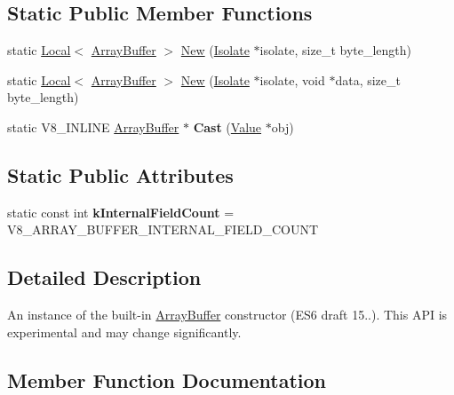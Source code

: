 \subsection*{Static Public Member Functions}
\begin{DoxyCompactItemize}
\item 
static \hyperlink{classv8_1_1_local}{Local}$<$ \hyperlink{classv8_1_1_array_buffer}{Array\+Buffer} $>$ \hyperlink{classv8_1_1_array_buffer_ad752e03d7cc7fe863656ad6183785ab7}{New} (\hyperlink{classv8_1_1_isolate}{Isolate} $\ast$isolate, size\+\_\+t byte\+\_\+length)
\item 
static \hyperlink{classv8_1_1_local}{Local}$<$ \hyperlink{classv8_1_1_array_buffer}{Array\+Buffer} $>$ \hyperlink{classv8_1_1_array_buffer_ad3e0120ae80077d607d5645c4f647932}{New} (\hyperlink{classv8_1_1_isolate}{Isolate} $\ast$isolate, void $\ast$data, size\+\_\+t byte\+\_\+length)
\item 
\hypertarget{classv8_1_1_array_buffer_a4b0a703ae34217507a8ebc9cabf7336a}{}static V8\+\_\+\+I\+N\+L\+I\+N\+E \hyperlink{classv8_1_1_array_buffer}{Array\+Buffer} $\ast$ {\bfseries Cast} (\hyperlink{classv8_1_1_value}{Value} $\ast$obj)\label{classv8_1_1_array_buffer_a4b0a703ae34217507a8ebc9cabf7336a}

\end{DoxyCompactItemize}
\subsection*{Static Public Attributes}
\begin{DoxyCompactItemize}
\item 
\hypertarget{classv8_1_1_array_buffer_af49000a2ea120e49da846ef02a42ac69}{}static const int {\bfseries k\+Internal\+Field\+Count} = V8\+\_\+\+A\+R\+R\+A\+Y\+\_\+\+B\+U\+F\+F\+E\+R\+\_\+\+I\+N\+T\+E\+R\+N\+A\+L\+\_\+\+F\+I\+E\+L\+D\+\_\+\+C\+O\+U\+N\+T\label{classv8_1_1_array_buffer_af49000a2ea120e49da846ef02a42ac69}

\end{DoxyCompactItemize}


\subsection{Detailed Description}
An instance of the built-\/in \hyperlink{classv8_1_1_array_buffer}{Array\+Buffer} constructor (E\+S6 draft 15..). This A\+P\+I is experimental and may change significantly. 

\subsection{Member Function Documentation}
\hypertarget{classv8_1_1_array_buffer_ab73b98ba6436b57c5a1b3d29429e0199}{}
